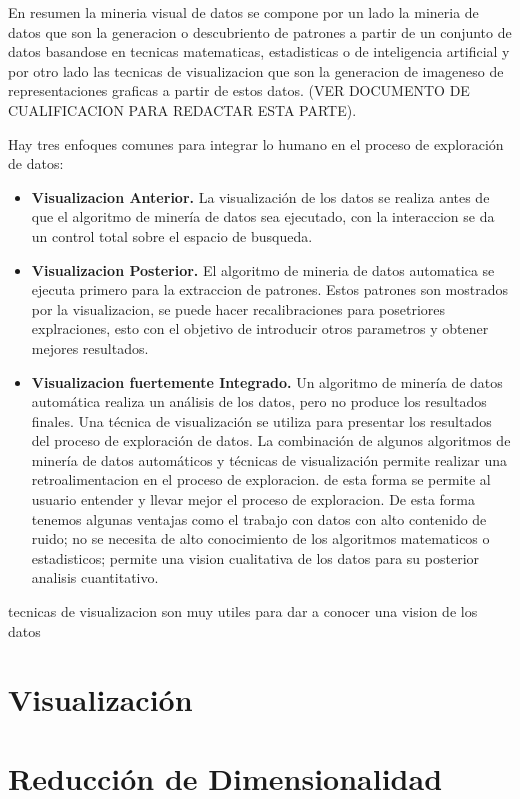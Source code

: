 En resumen la mineria visual de datos se compone por un lado la mineria de datos que son la generacion o descubriento de patrones a partir de un conjunto de datos basandose en tecnicas matematicas, estadisticas o de inteligencia artificial y por otro lado las tecnicas de visualizacion que son la generacion de imageneso de representaciones graficas a partir de estos datos. (VER DOCUMENTO DE CUALIFICACION PARA REDACTAR ESTA PARTE).

Hay tres enfoques comunes para integrar lo humano en el proceso de exploración de datos:
\begin{itemize}
	\item \textbf{Visualizacion Anterior.} La visualización de los datos se realiza antes de que el algoritmo de minería de datos sea ejecutado, con la interaccion se da un control total sobre el espacio de busqueda. 
	\item \textbf{Visualizacion Posterior.} El algoritmo de mineria de datos automatica se ejecuta primero para la extraccion de patrones. Estos patrones son mostrados por la visualizacion, se puede hacer recalibraciones para posetriores explraciones, esto con el objetivo de introducir otros parametros y obtener mejores resultados.
	\item \textbf{Visualizacion fuertemente Integrado.} Un algoritmo de minería de datos automática realiza un análisis de los datos, pero no produce los resultados finales. Una técnica de visualización se utiliza para presentar los resultados  del proceso de exploración de datos. La combinación de algunos algoritmos de minería de datos automáticos y técnicas de visualización permite  realizar una retroalimentacion en el proceso de exploracion. de esta forma se permite al usuario entender y llevar mejor el proceso de exploracion. De esta forma tenemos algunas ventajas como el trabajo con datos con alto contenido de ruido; no se necesita de alto conocimiento de los algoritmos matematicos o estadisticos; permite una vision cualitativa de los datos para su posterior analisis cuantitativo.
\end{itemize}
tecnicas de visualizacion son muy utiles para dar a conocer una vision de los datos
\section{Visualización}
\section{Reducción de Dimensionalidad}

